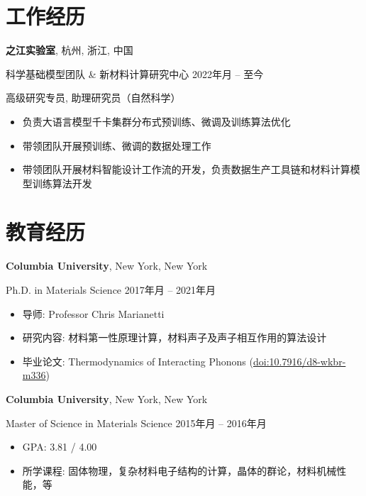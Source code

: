 \documentclass[
  a4paper,
  12pt
]{cv}
\author{富律文}
\renewcommand{\DatestampYMD}[3]{\mbox{#1年\number#2月}}
\begin{document}
\maketitle

\section{工作经历}

{\textbf{之江实验室}},
杭州, 浙江, 中国

科学基础模型团队 \& 新材料计算研究中心
\hfill
\DatestampYMD{2022}{07}{12} --
至今

高级研究专员, 助理研究员（自然科学）
\begin{itemize}
\item 负责大语言模型千卡集群分布式预训练、微调及训练算法优化
\item 带领团队开展预训练、微调的数据处理工作
\item 带领团队开展材料智能设计工作流的开发，负责数据生产工具链和材料计算模型训练算法开发
\end{itemize}

\section{教育经历}

{\textbf{Columbia University}},
New York, New York

Ph.D. in
{Materials Science}
\hfill
\DatestampYMD{2017}{01}{10} --
\DatestampYMD{2021}{10}{20}
\begin{itemize}
\item 导师: Professor Chris Marianetti
\item 研究内容: 材料第一性原理计算，材料声子及声子相互作用的算法设计
\item 毕业论文: Thermodynamics of Interacting Phonons (\href{https://doi.org/10.7916/d8-wkbr-m336}{doi:10.7916/d8-wkbr-m336})
\end{itemize}


{\textbf{Columbia University}},
New York, New York

Master of Science in
{Materials Science}
\hfill
\DatestampYMD{2015}{09}{01} --
\DatestampYMD{2016}{12}{23}
\begin{itemize}
\item GPA: 3.81 / 4.00
\item 所学课程: 固体物理，复杂材料电子结构的计算，晶体的群论，材料机械性能，等
\end{itemize}
\end{document}
